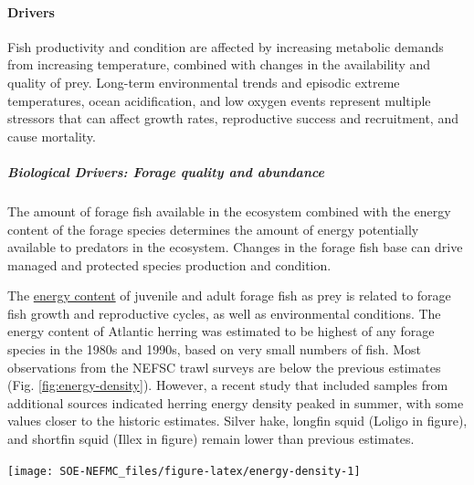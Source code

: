 \documentclass[
  10pt,
]{article}
\let\origfigure\figure
\let\endorigfigure\endfigure
\renewenvironment{figure}[1][2] {
    \expandafter\origfigure\expandafter[H]
} {
    \endorigfigure
}
\begin{document}
\hypertarget{drivers-2}{%
\paragraph{Drivers}\label{drivers-2}}

Fish productivity and condition are affected by increasing metabolic demands from increasing temperature, combined with changes in the availability and quality of prey. Long-term environmental trends and episodic extreme temperatures, ocean acidification, and low oxygen events represent multiple stressors that can affect growth rates, reproductive success and recruitment, and cause mortality.

\hypertarget{biological-drivers-forage-quality-and-abundance}{%
\subparagraph{Biological Drivers: Forage quality and abundance}\label{biological-drivers-forage-quality-and-abundance}}

The amount of forage fish available in the ecosystem combined with the energy content of the forage species determines the amount of energy potentially available to predators in the ecosystem. Changes in the forage fish base can drive managed and protected species production and condition.

The \href{https://noaa-edab.github.io/catalog/energy_density.html}{energy content} of juvenile and adult forage fish as prey is related to forage fish growth and reproductive cycles, as well as environmental conditions. The energy content of Atlantic herring was estimated to be highest of any forage species in the 1980s and 1990s, based on very small numbers of fish. Most observations from the NEFSC trawl surveys are below the previous estimates (Fig. \ref{fig:energy-density}). However, a recent study that included samples from additional sources indicated herring energy density peaked in summer, with some values closer to the historic estimates. Silver hake, longfin squid (Loligo in figure), and shortfin squid (Illex in figure) remain lower than previous estimates.

\begin{figure}

{\centering \texttt{[image: SOE-NEFMC\_files/figure-latex/energy-density-1]} 

}

\caption{Forage fish energy density mean and standard deviation by season and year, compared with 1980s (solid line; Steimle and Terranove 1985) and 1990s (dashed line; Lawson et al. 1998) values.}\label{fig:energy-density}
\end{figure}
\end{document}
